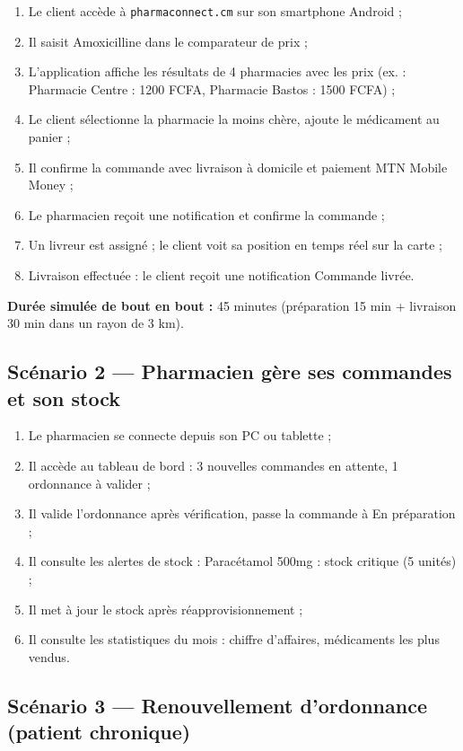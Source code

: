 \documentclass[12pt,a4paper,oneside]{report}
\begin{document}
\begin{enumerate}
  \item Le client accède à \texttt{pharmaconnect.cm} sur son smartphone Android ;
  \item Il saisit \og{}Amoxicilline\fg{} dans le comparateur de prix ;
  \item L'application affiche les résultats de 4 pharmacies avec les prix (ex. : Pharmacie Centre : 1200 FCFA, Pharmacie Bastos : 1500 FCFA) ;
  \item Le client sélectionne la pharmacie la moins chère, ajoute le médicament au panier ;
  \item Il confirme la commande avec livraison à domicile et paiement MTN Mobile Money ;
  \item Le pharmacien reçoit une notification et confirme la commande ;
  \item Un livreur est assigné ; le client voit sa position en temps réel sur la carte ;
  \item Livraison effectuée : le client reçoit une notification \og{}Commande livrée\fg{}.
\end{enumerate}

\textbf{Durée simulée de bout en bout :} 45 minutes (préparation 15 min + livraison 30 min dans un rayon de 3 km).

\subsection{Scénario 2 — Pharmacien gère ses commandes et son stock}

\begin{enumerate}
  \item Le pharmacien se connecte depuis son PC ou tablette ;
  \item Il accède au tableau de bord : 3 nouvelles commandes en attente, 1 ordonnance à valider ;
  \item Il valide l'ordonnance après vérification, passe la commande à \og{}En préparation\fg{} ;
  \item Il consulte les alertes de stock : \og{}Paracétamol 500mg : stock critique (5 unités)\fg{} ;
  \item Il met à jour le stock après réapprovisionnement ;
  \item Il consulte les statistiques du mois : chiffre d'affaires, médicaments les plus vendus.
\end{enumerate}

\subsection{Scénario 3 — Renouvellement d'ordonnance (patient chronique)}
\end{document}
